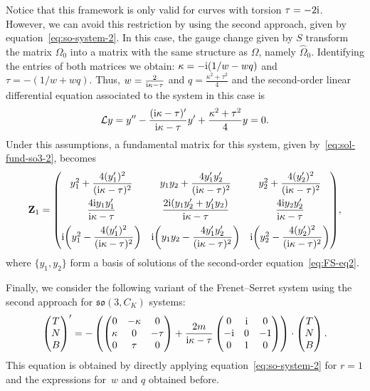 \documentclass[10pt,a4paper]{amsart}
\numberwithin{equation}{section}
\begin{document}
Notice that this framework is only valid for curves with torsion $\tau=-2{\rm i}$. However, we can avoid this restriction by using the second approach, given by equation~\eqref{eq:so-system-2}. In this case, the gauge change given by $S$ transform the matrix $\Omega_0$ into a matrix with the same structure as $\Omega$, namely $\widehat{\Omega}_0$. Identifying the entries of both matrices we obtain: $\kappa = -{\rm i}(1/w -wq)$ and $\tau = -(1/w +wq)$. Thus, $w = \frac{2}{{\rm i}\kappa - \tau}$ and $q = \frac{\kappa^2 + \tau^2}{4}$ and the second-order linear differential equation associated to the system in this case is
\begin{gather}\label{eq:FS-eq2}
 \mathcal{L} y = y'' - \dfrac{({\rm i}\kappa - \tau)'}{{\rm i} \kappa - \tau} y' +\dfrac{\kappa^2 + \tau^2}{4}y =0.
\end{gather}
Under this assumptions, a fundamental matrix for this system, given by~\eqref{eq:sol-fund-so3-2}, becomes{\samepage
\begin{gather*}
\mathbf{Z}_1 = \begin{pmatrix}
y_1^2 + \dfrac{4(y_1')^2}{({\rm i}\kappa - \tau)^2} & y_1 y_2 + \dfrac{4y_1' y_2'}{({\rm i}\kappa - \tau)^2} & y_2^2 + \dfrac{4 (y_2')^2}{({\rm i}\kappa - \tau)^2} \\[9pt]
\dfrac{4{\rm i} y_1 y_1'}{{\rm i}\kappa - \tau} & \dfrac{2{\rm i} (y_1 y_2' + y_1' y_2)}{{\rm i}\kappa - \tau} & \dfrac{4{\rm i} y_2 y_2'}{{\rm i}\kappa - \tau} \\[9pt]
{\rm i} \bigg( y_1^2 - \dfrac{4 (y_1')^2}{({\rm i}\kappa - \tau)^2}\bigg) & {\rm i} \bigg( y_1 y_2 - \dfrac{4 y_1' y_2'}{({\rm i}\kappa - \tau)^2} \bigg) & {\rm i} \bigg( y_2^2 - \dfrac{4 (y_2')^2}{({\rm i}\kappa - \tau)^2} \bigg ) \end{pmatrix}\!,
\end{gather*}
where $\{ y_1, y_2\}$ form a basis of solutions of the second-order equation~\eqref{eq:FS-eq2}.}

Finally, we consider the following
variant of the Frenet--Serret system using the second approach for $\mathfrak{so}(3, C_K)$ systems:
\begin{gather*}
\begin{pmatrix} T \\ N \\ B \end{pmatrix}' = - \left ( \begin{pmatrix}
0 & -\kappa & 0 \\ \kappa & 0 & - \tau \\ 0 & \tau & 0 \end{pmatrix} + \frac{2m}{{\rm i}\kappa - \tau} \begin{pmatrix} 0 & {\rm i} & 0 \\ -{\rm i} & 0 & -1 \\ 0 & 1 & 0 \end{pmatrix} \right ) \cdot \begin{pmatrix} T \\ N \\ B \end{pmatrix} .
\end{gather*}
This equation is obtained by directly applying equation~\eqref{eq:so-system-2}
 for $r=1$ and the expressions for~$w$ and $q$ obtained before.
\end{document}

